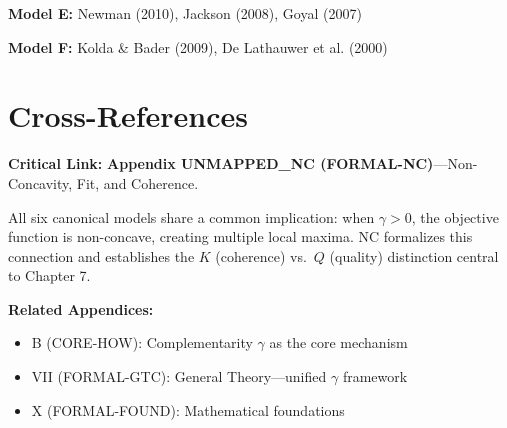 \textbf{Model E:} Newman (2010), Jackson (2008), Goyal (2007)

\textbf{Model F:} Kolda \& Bader (2009), De Lathauwer et al. (2000)

\section{Cross-References}
\label{sec:mdl-crossref}

\begin{tcolorbox}[colback=gray!5!white, colframe=gray!50!black]
\textbf{Critical Link:} \textbf{Appendix UNMAPPED_NC (FORMAL-NC)}---Non-Concavity, Fit, and Coherence.

All six canonical models share a common implication: when $\gamma > 0$, the objective function is non-concave, creating multiple local maxima. NC formalizes this connection and establishes the $K$ (coherence) vs.\ $Q$ (quality) distinction central to Chapter 7.

\textbf{Related Appendices:}
\begin{itemize}[nosep]
\item B (CORE-HOW): Complementarity $\gamma$ as the core mechanism
\item VII (FORMAL-GTC): General Theory---unified $\gamma$ framework
\item X (FORMAL-FOUND): Mathematical foundations
\end{itemize}
\end{tcolorbox}


